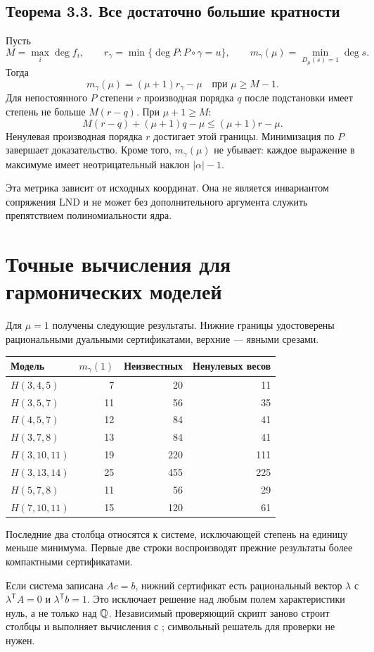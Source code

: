\subsection*{Теорема 3.3. Все достаточно большие кратности}
Пусть
\[
M=\max_i\deg f_i,\qquad
r_\gamma=\min\{\deg P:P\circ\gamma=u\},\qquad
m_\gamma(\mu)=\min_{D_\mu(s)=1}\deg s.
\]
Тогда
\[
\boxed{m_\gamma(\mu)=(\mu+1)r_\gamma-\mu\quad\text{при }\mu\ge M-1.}
\]
Для непостоянного $P$ степени $r$ производная порядка $q$ после подстановки имеет степень не больше $M(r-q)$. При $\mu+1\ge M$:
\[
M(r-q)+(\mu+1)q-\mu\le(\mu+1)r-\mu.
\]
Ненулевая производная порядка $r$ достигает этой границы. Минимизация по $P$ завершает доказательство. Кроме того, $m_\gamma(\mu)$ не убывает: каждое выражение в максимуме имеет неотрицательный наклон $|\alpha|-1$.

Эта метрика зависит от исходных координат. Она не является инвариантом сопряжения LND и не может без дополнительного аргумента служить препятствием полиномиальности ядра.

\section{Точные вычисления для гармонических моделей}\label{sec:computed}
Для $\mu=1$ получены следующие результаты. Нижние границы удостоверены рациональными дуальными сертификатами, верхние --- явными срезами.

\begin{center}\small\renewcommand{\arraystretch}{1.22}
\begin{tabular}{@{}lrrr@{}}\toprule
Модель & $m_\gamma(1)$ & Неизвестных & Ненулевых весов\\\midrule
$H(3,4,5)$ &7&20&11\\
$H(3,5,7)$ &11&56&35\\
$H(4,5,7)$ &12&84&41\\
$H(3,7,8)$ &13&84&41\\
$H(3,10,11)$ &19&220&111\\
$H(3,13,14)$ &25&455&225\\
$H(5,7,8)$ &11&56&29\\
$H(7,10,11)$ &15&120&61\\\bottomrule
\end{tabular}\end{center}
Последние два столбца относятся к системе, исключающей степень на единицу меньше минимума. Первые две строки воспроизводят прежние результаты более компактными сертификатами.

Если система записана $A c=b$, нижний сертификат есть рациональный вектор $\lambda$ с $\lambda^{\mathsf T}A=0$ и $\lambda^{\mathsf T}b=1$. Это исключает решение над любым полем характеристики нуль, а не только над ${\mathbb{Q}}$. Независимый проверяющий скрипт заново строит столбцы и выполняет вычисления с ; символьный решатель для проверки не нужен.

